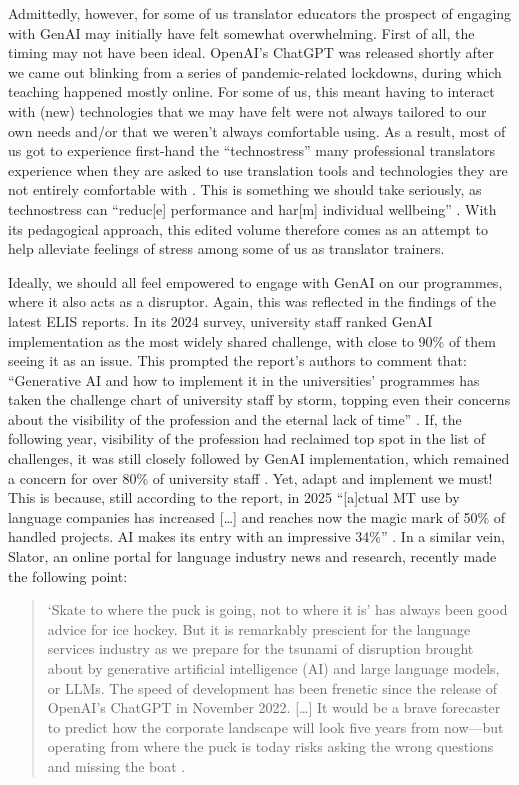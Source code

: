 \documentclass[output=paper]{langscibook}
\begin{document}
Admittedly, however, for some of us translator educators the prospect of engaging with GenAI may initially have felt somewhat overwhelming. First of all, the timing may not have been ideal. OpenAI’s ChatGPT was released shortly after we came out blinking from a series of pandemic-related lockdowns, during which teaching happened mostly online. For some of us, this meant having to interact with (new) technologies that we may have felt were not always tailored to our own needs and/or that we weren’t always comfortable using. As a result, most of us got to experience first-hand the “technostress” many professional translators experience when they are asked to use translation tools and technologies they are not entirely comfortable with \citep{Penet2024}. This is something we should take seriously, as technostress can “reduc[e] performance and har[m] individual wellbeing” \citep[146]{Koskinen2020}. With its pedagogical approach, this edited volume therefore comes as an attempt to help alleviate feelings of stress among some of us as translator trainers.

Ideally, we should all feel empowered to engage with GenAI on our programmes, where it also acts as a disruptor. Again, this was reflected in the findings of the latest ELIS reports. In its 2024 survey, university staff ranked GenAI implementation as the most widely shared challenge, with close to 90\% of them seeing it as an issue. This prompted the report’s authors to comment that: “Generative AI and how to implement it in the universities' programmes has taken the challenge chart of university staff by storm, topping even their concerns about the visibility of the profession and the eternal lack of time” \citep[27]{elis_elis_2024}. If, the following year, visibility of the profession had reclaimed top spot in the list of challenges, it was still closely followed by GenAI implementation, which remained a concern for over 80\% of university staff \citep[25]{elis_elis_2025}. Yet, adapt and implement we must! This is because, still according to the report, in 2025 “[a]ctual MT use by language companies has increased […] and reaches now the magic mark of 50\% of handled projects. AI makes its entry with an impressive 34\%” \citep[35]{elis_elis_2025}. In a similar vein, Slator, an online portal for language industry news and research, recently made the following point: 
\begin{quote}
    ‘Skate to where the puck is going, not to where it is’ has always been good advice for ice hockey. But it is remarkably prescient for the language services industry as we prepare for the tsunami of disruption brought about by generative artificial intelligence (AI) and large language models, or LLMs. The speed of development has been frenetic since the release of OpenAI’s ChatGPT in November 2022. […] It would be a brave forecaster to predict how the corporate landscape will look five years from now—but operating from where the puck is today risks asking the wrong questions and missing the boat \citep{slator_disruption_2023}.
\end{quote}
\end{document}
